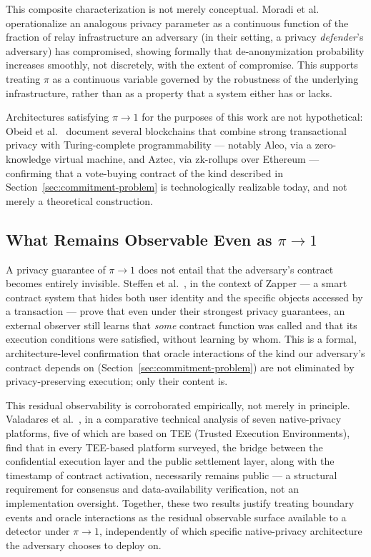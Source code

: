 \documentclass[journal,onecolumn,11pt]{IEEEtran}
\begin{document}
This composite characterization is not merely conceptual. Moradi et
al.~\cite{moradi2025privacy} operationalize an analogous privacy parameter as
a continuous function of the fraction of relay infrastructure an adversary
(in their setting, a privacy \emph{defender}'s adversary) has compromised,
showing formally that de-anonymization probability increases smoothly, not
discretely, with the extent of compromise. This supports treating $\pi$ as a
continuous variable governed by the robustness of the underlying
infrastructure, rather than as a property that a system either has or lacks.

Architectures satisfying $\pi \to 1$ for the purposes of this work are not
hypothetical: Obeid et al.~\cite{obeid2025comparative} document several
blockchains that combine strong transactional privacy with Turing-complete
programmability --- notably Aleo, via a zero-knowledge virtual machine, and
Aztec, via zk-rollups over Ethereum --- confirming that a vote-buying contract
of the kind described in Section~\ref{sec:commitment-problem} is
technologically realizable today, and not merely a theoretical construction.


\subsection{What Remains Observable Even as $\pi \to 1$}
\label{subsec:residual-observability}

A privacy guarantee of $\pi \to 1$ does not entail that the adversary's
contract becomes entirely invisible. Steffen et al.~\cite{steffen2022zapper},
in the context of Zapper --- a smart contract system that hides both user
identity and the specific objects accessed by a transaction --- prove that
even under their strongest privacy guarantees, an external observer still
learns that \emph{some} contract function was called and that its execution
conditions were satisfied, without learning by whom. This is a formal, architecture-level confirmation that oracle
interactions of the kind our adversary's contract depends on
(Section~\ref{sec:commitment-problem}) are not eliminated by privacy-preserving
execution; only their content is.

This residual observability is corroborated empirically, not merely in
principle. Valadares et al.~\cite{valadares2023privacy}, in a comparative
technical analysis of seven native-privacy platforms, five of which are based on TEE (Trusted Execution Environments), find that in every TEE-based platform surveyed, the bridge between the confidential execution layer and the
public settlement layer, along with the timestamp of contract activation,
necessarily remains public — a structural requirement for consensus and
data-availability verification, not an implementation oversight. Together,
these two results justify treating boundary events and oracle interactions as
the residual observable surface available to a detector under $\pi \to 1$,
independently of which specific native-privacy architecture the adversary
chooses to deploy on.
\end{document}

